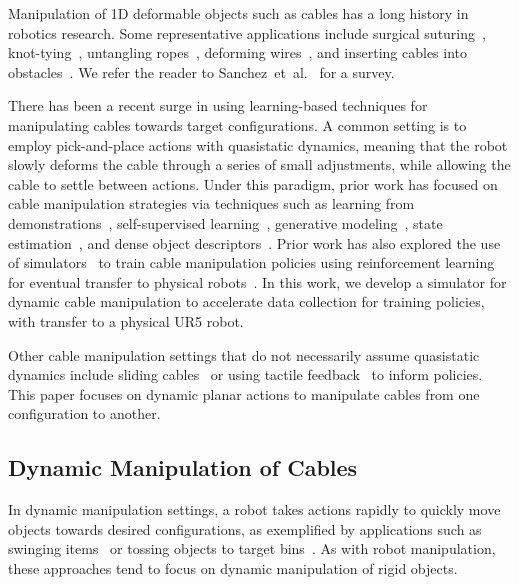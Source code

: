 \documentclass[letterpaper, 10 pt, conference]{ieeeconf}  %
\begin{document}
Manipulation of 1D deformable objects such as cables has a long history in robotics research. Some representative applications include surgical suturing~\cite{robot_heart_surgery_2006,schulman_case_study_2013,suturing_autolab_2016}, knot-tying~\cite{van_den_berg_2010,case_study_knots_1991,knot_planning_2003,tying_precisely_2016}, untangling ropes~\cite{rope_untangling_2013,grannen2020untangling,tactile_cable_2020}, deforming wires~\cite{wire_insertion_1996,wire_insertion_1997}, and inserting cables into obstacles~\cite{tight_tolerance_insertion_2015}. We refer the reader to Sanchez~et~al.~\cite{manip_deformable_survey_2018} for a survey. %

There has been a recent surge in using learning-based techniques for manipulating cables towards target configurations. A common setting is to employ pick-and-place actions with quasistatic dynamics, meaning that the robot slowly deforms the cable through a series of small adjustments, while allowing the cable to settle between actions. Under this paradigm, prior work has focused on cable manipulation strategies via techniques such as learning from demonstrations~\cite{zeng_transporters_2020,seita_bags_2021}, self-supervised learning~\cite{nair_rope_2017,ZSVI_2018}, generative modeling~\cite{wang_visual_planning_2019}, state estimation~\cite{state_estimation_LDO}, and dense object descriptors~\cite{priya_2020}. Prior work has also explored the use of simulators~\cite{mujoco,corl2020softgym} to train cable manipulation policies using reinforcement learning for eventual transfer to physical robots~\cite{lerrel_2020,yan_fabrics_latent_2020}. In this work, we develop a simulator for dynamic cable manipulation to accelerate data collection for training policies, with transfer to a physical UR5 robot.

Other cable manipulation settings that do not necessarily assume quasistatic dynamics include sliding cables~\cite{one_hand_knotting_tactile_2007,zhu_sliding_cables_2019} or using tactile feedback~\cite{tactile_cable_2020} to inform policies. This paper focuses on dynamic planar actions to manipulate cables from one configuration to another.


\subsection{Dynamic Manipulation of Cables}

In dynamic manipulation settings, a robot takes actions rapidly to quickly move objects towards desired configurations, as exemplified by applications such as swinging items~\cite{swingbot_2020,diabolo_2020} or tossing objects to target bins~\cite{zeng_tossing_2019}. As with robot manipulation, these approaches tend to focus on dynamic manipulation of rigid objects.
\end{document}
